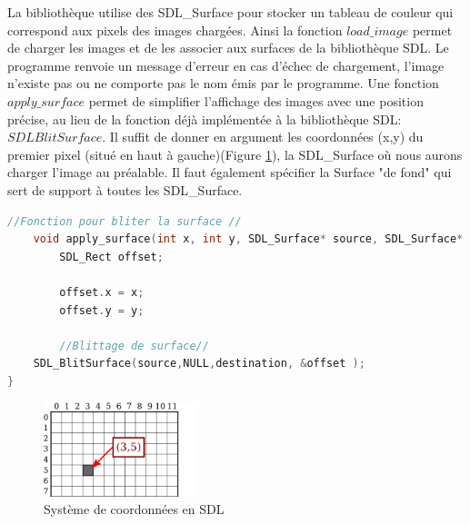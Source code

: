 \documentclass[light]{ceri}
\begin{document}
\indent La bibliothèque utilise des SDL\_Surface pour stocker un tableau de couleur qui correspond aux pixels des images chargées. Ainsi la fonction \begin{math}load\_image\end{math} permet de charger les images et de les associer aux surfaces de la bibliothèque SDL. Le programme renvoie un message d'erreur en cas d'échec de chargement, l'image n'existe pas ou ne comporte pas le nom émis par le programme. Une fonction \begin{math}apply\_surface\end{math} permet de simplifier l'affichage des images avec une position précise, au lieu de la fonction déjà implémentée à la bibliothèque SDL: \begin{math}SDLBlitSurface\end{math}. Il suffit de donner en argument les coordonnées (x,y) du premier pixel (situé en haut à gauche)(Figure \ref{coords1}), la SDL\_Surface où nous aurons charger l'image au préalable. Il faut également spécifier la Surface "de fond" qui sert de support à toutes les SDL\_Surface.\\
    \begin{lstlisting}[language=c]
    //Fonction pour bliter la surface //
    void apply_surface(int x, int y, SDL_Surface* source, SDL_Surface* destination){
        SDL_Rect offset;
    
        offset.x = x;
        offset.y = y;
    
        //Blittage de surface//
    SDL_BlitSurface(source,NULL,destination, &offset );
}
    \end{lstlisting}
    
\begin{figure}[!h]

    \centering
    \includegraphics[width=0.4\textwidth]{images/coords1.png} 
  \caption{Système de coordonnées en SDL}
    \label{coords1}

\end{figure}   
\end{document}
